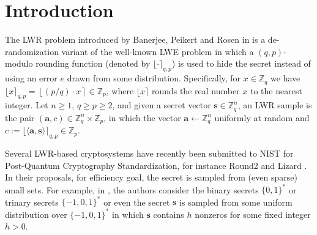 \documentclass[runningheads]{llncs}
\begin{document}
\section{Introduction}

The LWR problem introduced by Banerjee, Peikert and Rosen in \cite{BPR12} is a de-randomization variant of the well-known LWE problem in which a $(q,p)$-modulo rounding function (denoted by $\lfloor \cdot \rceil_{q,p}$) is used to hide the secret instead of using an error $e$ drawn from some distribution. 
Specifically, for $x \in \mathbb{Z}_q$ we have $\lfloor x \rceil_{q,p}=\left \lfloor (p/q) \cdot x \right \rceil \in \mathbb{Z}_p$, where $\lfloor x \rceil$ rounds the real number $x$ to the nearest integer. Let $n \geq 1$, $q \geq p \geq 2$, and given a secret vector $\mathbf{s} \in \mathbb{Z}_q^n$, an LWR sample is the pair $(\mathbf{a},c) \in \mathbb{Z}_q^n \times \mathbb{Z}_p$, in which the vector $\mathbf{a} \leftarrow \mathbb{Z}_q^n$ uniformly at random and $c:=\lfloor\langle \mathbf{a},\mathbf{s} \rangle \rceil_{q,p}\in \mathbb{Z}_p$. 



Several LWR-based cryptosystems have recently been submitted to NIST for Post-Quantum Cryptography Standardization, for instance Round2 \cite{BBGM+17} and  Lizard \cite{CKLS16}. In their proposals, for efficiency goal, the secret is sampled from (even sparse) small sets. For example, in  \cite{CKLS16}, the authors consider the binary secrets $\{0,1\}^*$ or trinary secrets $\{-1,0,1\}^*$ or even the secret $\mathbf{s}$ is sampled from some uniform distribution over $\{-1,0,1\}^*$ in which $\mathbf{s}$ contains $h$ nonzeros for some fixed integer $h>0$. 

\end{document}
